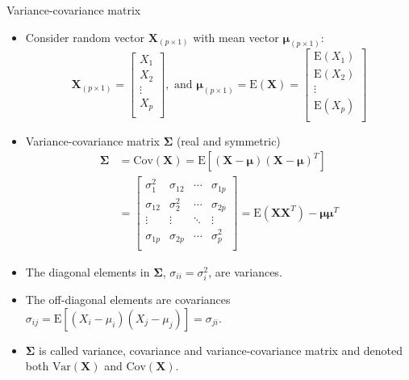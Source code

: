 \documentclass[
  ignorenonframetext,
]{beamer}
\begin{document}
\begin{frame}
\begin{block}{Variance-covariance matrix}
\protect\hypertarget{variance-covariance-matrix}{}
\vspace{2mm}

\begin{itemize}
\item
  Consider random vector \(\boldsymbol{X}_{(p\times 1)}\) with mean
  vector \(\boldsymbol{\mu}_{(p\times 1)}\):
  \[\boldsymbol{X}_{(p\times 1)} =\left[ \begin{array}{c} X_1\\ X_2\\ \vdots\\ X_p\\ \end{array} \right], \text{ and }\boldsymbol{\mu}_{(p\times 1)} =\text{E}(\boldsymbol{X})=\left[ \begin{array}{c} \text{E}(X_1)\\ \text{E}(X_2)\\ \vdots\\ \text{E}(X_p)\\ \end{array}\right]\]
\item
  Variance-covariance matrix \(\boldsymbol\Sigma\) (real and symmetric)
  \begin{align*}
  \boldsymbol\Sigma & =\text{Cov}(\boldsymbol{X})  
  =\text{E}[(\boldsymbol{X}-\boldsymbol{\mu})(\boldsymbol{X}-\boldsymbol{\mu})^T] \\
  & = \left[ \begin{array}{cccc} \sigma_{1}^2 & \sigma_{12} & \cdots & \sigma_{1p}\\ \sigma_{12} & \sigma_{2}^2 & \cdots & \sigma_{2p}\\ \vdots & \vdots & \ddots & \vdots\\ \sigma_{1p} & \sigma_{2p} & \cdots & \sigma_{p}^2\\ \end{array}  \right] 
   = \text{E}(\boldsymbol{X}\boldsymbol{X}^T)-\boldsymbol{\mu}\boldsymbol{\mu}^T
  \end{align*}
\end{itemize}
\end{block}
\end{frame}

\begin{frame}
\begin{itemize}
\item
  The diagonal elements in \(\boldsymbol\Sigma\),
  \(\sigma_{ii}=\sigma_i^2\), are variances.
\item
  The off-diagonal elements are covariances
  \(\sigma_{ij}=\text{E}[(X_i-\mu_i)(X_j-\mu_j)]=\sigma_{ji}\).
\item
  \(\boldsymbol\Sigma\) is called variance, covariance and
  variance-covariance matrix and denoted both
  \(\text{Var}(\boldsymbol{X})\) and \(\text{Cov}(\boldsymbol{X})\).
\end{itemize}
\end{frame}
\end{document}
